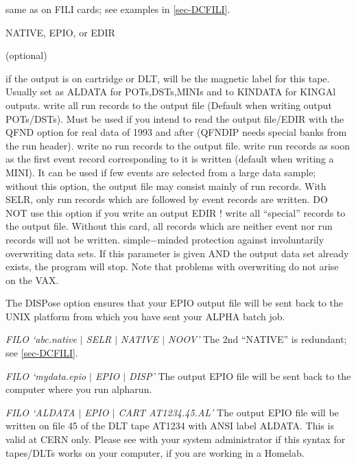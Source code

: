 \begin{indentlist}{ 3.75cm}{ 4.00cm}
same as on FILI cards; see examples in
\ref{sec-DCFILI}.
\begin{indentlist}{ 2.50cm}{ 2.75cm}
NATIVE, EPIO, or EDIR\end{indentlist}
 (optional)

if the output is on cartridge or DLT, will be the magnetic label for this tape. Usually set as ALDATA for POTs,DSTs,MINIs
and to KINDATA for KINGAl outputs.
write all run records to the output file (Default when writing output POTs/DSTs).
Must be used
if you intend to read the output file/EDIR with the QFND option
for real data of 1993 and after (QFNDIP needs special banks from the
run header).
write no run records to the output file.
write run records as soon as the first event record
corresponding to it is written (default when writing a MINI).
 It can be used if few events
are selected from a large data sample; without this option,
the output file may consist mainly of run records.
With SELR, only run records which
are followed by event records are written.
DO NOT use this option if you write an output EDIR !
write all ``special'' records to the output file. Without this
card, all records which are neither event nor run records will
not be written.
simple$-$minded protection against involuntarily overwriting
data sets. If this parameter is given AND the output data set
already exists, the program will stop. Note that problems with
overwriting do not arise on the VAX.
 
The DISPose option ensures that your EPIO output file will be sent back to the UNIX platform
from which you have sent your ALPHA batch job.
 
{\it FILO `abc.native $\mid$ SELR $\mid$ NATIVE $\mid$ NOOV'}
The 2nd ``NATIVE'' is redundant; see \ref{sec-DCFILI}.
 
{\it FILO `mydata.epio $\mid$ EPIO $\mid$ DISP'}
The output EPIO file will be sent back to the computer where you run alpharun.

{\it FILO `ALDATA $\mid$ EPIO $\mid$ CART AT1234.45.AL'}
The output EPIO file will be written on file 45 of the DLT tape AT1234 with ANSI label ALDATA.
This is valid at CERN only. Please see with your system administrator if this syntax for tapes/DLTs works on your computer, if
you are working in a Homelab.
\end{indentlist}
